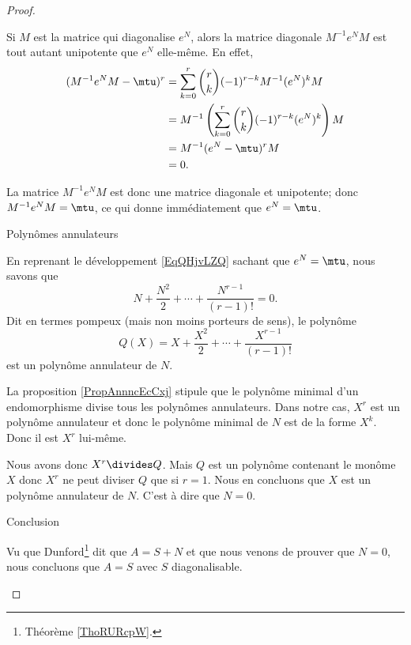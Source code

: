 \begin{proof}
\begin{subproof}
            Si \( M\) est la matrice qui diagonalise \( e^N\), alors la matrice diagonale \( M^{-1}e^NM\) est tout autant unipotente que \( e^N\) elle-même. En effet,
            \begin{subequations}
                \begin{align}
                    (M^{-1}e^NM-\mtu)^r&=\sum_{k=0}^r\binom{ r }{ k }(-1)^{r-k}M^{-1}(e^N)^kM\\
                    &=M^{-1}\left( \sum_{k=0}^r\binom{ r }{ k }(-1)^{r-k}(e^N)^k \right)M\\
                    &=M^{-1}(e^N-\mtu)^rM\\
                    &=0.
                \end{align}
            \end{subequations}

            La matrice \( M^{-1}e^NM\) est donc une matrice diagonale et unipotente; donc \( M^{-1}e^NM=\mtu\), ce qui donne immédiatement que \( e^N=\mtu\).

        \item[Polynômes annulateurs]

            En reprenant le développement \eqref{EqQHjvLZQ} sachant que \( e^N=\mtu\), nous savons que
            \begin{equation}
                N+\frac{ N^2 }{2}+\cdots +\frac{ N^{r-1} }{ (r-1)! }=0.
            \end{equation}
            Dit en termes pompeux (mais non moins porteurs de sens), le polynôme
            \begin{equation}
                Q(X)=X+\frac{ X^2 }{2}+\cdots +\frac{ X^{r-1} }{ (r-1)! }
            \end{equation}
            est un polynôme annulateur de \( N\).
            
            La proposition \ref{PropAnnncEcCxj} stipule que le polynôme minimal d'un endomorphisme divise tous les polynômes annulateurs. Dans notre cas, \( X^r\) est un polynôme annulateur et donc le polynôme minimal de \( N\) est de la forme \( X^k\). Donc il est \( X^r\) lui-même.
            
            Nous avons donc \( X^r\divides Q\). Mais \( Q\) est un polynôme contenant le monôme \( X\) donc \( X^r\) ne peut diviser \( Q\) que si \( r=1\). Nous en concluons que \( X\) est un polynôme annulateur de \( N\). C'est à dire que \( N=0\).

        \item[Conclusion]

            Vu que Dunford\footnote{Théorème \ref{ThoRURcpW}.} dit que \( A=S+N\) et que nous venons de prouver que \( N=0\), nous concluons que \( A=S\) avec \( S\) diagonalisable.

    \end{subproof}
\end{proof}

